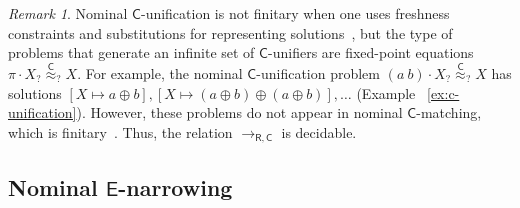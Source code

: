 \documentclass[11pt,a4paper]{amsart}
\newcommand{\daniele}[1]{\textcolor{cyan}{#1}}
\newcommand{\theory}[1]{\ensuremath{\mathsf{#1}}}
\theoremstyle{plain}
\theoremstyle{definition}
\theoremstyle{remark}
\newtheorem{remark}[theorem]{Remark}
\begin{document}
    

\begin{remark}\label{rmk:cunif-notfin}
Nominal $\theory{C}$-unification is not finitary when one uses freshness constraints and substitutions for representing solutions~\cite{OnSolvingNomFPequations/frocos/Washington17}, but the type of problems that generate an infinite set of $\theory{C}$-unifiers are fixed-point equations $\pi\cdot X _?{\overset{\theory{C}}{\approx}}_?  X$. For example, the nominal \theory{C}-unification problem $(a \ b)\cdot X _?{\overset{\theory{C}}{\approx}}_?  X$  has solutions $[X\mapsto a\oplus b], [X\mapsto (a\oplus b)\oplus (a \oplus b)],\ldots$ (Example~ \ref{ex:c-unification}). However, these problems do not appear in nominal $\theory{C}$-matching, which is finitary~\cite{AFormalisationofNomCmatching/entcs/Ayala-RinconSFN19}. Thus, the relation $\to_{\theory{R,C}}$ is decidable. %
\end{remark}





\subsection{Nominal \theory{E}-narrowing}
\end{document}
